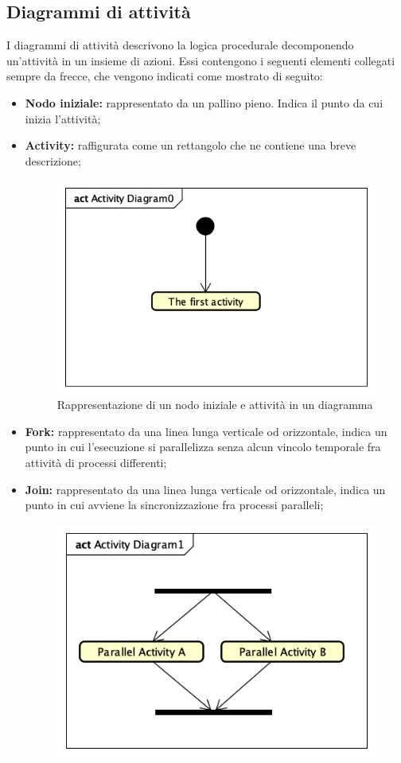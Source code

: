 \subsection{Diagrammi di attività}
\label{DiagrammiAttivita}
I diagrammi di attività descrivono la logica procedurale decomponendo un'attività in un insieme di azioni. Essi contengono i seguenti elementi collegati sempre da frecce, che vengono indicati come mostrato di seguito:
\begin{itemize}
	\item \textbf{Nodo iniziale:} rappresentato da un pallino pieno. Indica il punto da cui inizia l'attività;
	\item \textbf{Activity:} raffigurata come un rettangolo che ne contiene una breve descrizione;
	\begin{figure}[h]
		\centering
		\includegraphics[scale=0.5]{images/PrimaActivity.png}
		\caption{Rappresentazione di un nodo iniziale e attività in un diagramma}\label{}
	\end{figure}
	\item \textbf{Fork:} rappresentato da una linea lunga verticale od orizzontale, indica un punto in cui l'esecuzione si parallelizza senza alcun vincolo temporale fra attività di processi differenti;
	\item \textbf{Join:} rappresentato da una linea lunga verticale od orizzontale, indica un punto in cui avviene la sincronizzazione fra processi paralleli;
		\begin{figure}[h]
		\centering
		\includegraphics[scale=0.5]{images/ForkJoin.png}

\end{figure}
\end{itemize}
